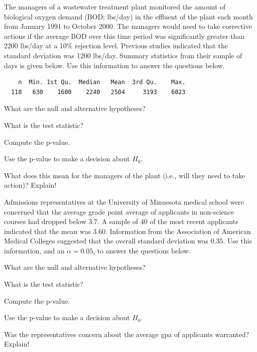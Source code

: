 \documentclass[10pt,openany]{book}\usepackage[]{graphicx}\usepackage[]{color}
\begin{document}
\vspace{-18pt}
\begin{exsection}
\vspace{-12pt}
  \item \label{revex:HypTEffluent} The managers of a wastewater treatment plant monitored the amount of biological oxygen demand (BOD; lbs/day) in the effluent of the plant each month from January 1991 to October 2000.  The managers would need to take corrective actions if the average BOD over this time period was significantly greater than 2200 lbs/day at a 10\% rejection level.  Previous studies indicated that the standard deviation was 1200 lbs/day.  Summary statistics from their sample of days is given below.  Use this information to answer the questions below. 
  \begin{Verbatim}
    n  Min. 1st Qu.  Median   Mean  3rd Qu.    Max.
  118   630    1600    2240   2504     3193    6023
  \end{Verbatim}

  \begin{Enumerate}
    \item What are the null and alternative hypotheses?
    \item What is the test statistic?
    \item \rhw{} Compute the p-value.
    \item Use the p-value to make a decision about $H_{0}$.
    \item What does this mean for the managers of the plant (i.e., will they need to take action)? Explain!
  \end{Enumerate}

  \item \label{revex:HypTMedSchool} Admissions representatives at the University of Minnesota medical school were concerned that the average grade point average of applicants in non-science courses had dropped below 3.7.  A sample of 40 of the most recent applicants indicated that the mean was 3.60.  Information from the Association of American Medical Colleges suggested that the overall standard deviation was 0.35.  Use this information, and an $\alpha=0.05$, to answer the questions below. 
  \begin{Enumerate}
    \item What are the null and alternative hypotheses?
    \item What is the test statistic?
    \item \rhw{} Compute the p-value.
    \item Use the p-value to make a decision about $H_{0}$.
    \item Was the representatives concern about the average gpa of applicants warranted?  Explain!
  \end{Enumerate}

\end{exsection}
\end{document}
